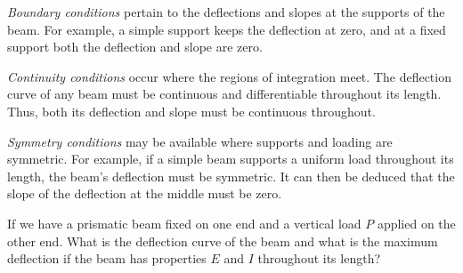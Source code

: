 \documentclass[
10pt,
a4paper,
openany,
svgnames,
]{kaobook} %
\begin{document}
\emph{Boundary conditions} pertain to the deflections and slopes at the supports of the beam. For example, a simple support keeps the deflection at zero, and at a fixed support both the deflection and slope are zero.

\emph{Continuity conditions} occur where the regions of integration meet. The deflection curve of any beam must be continuous and differentiable throughout its length. Thus, both its deflection and slope must be continuous throughout.

\emph{Symmetry conditions} may be available where supports and loading are symmetric. For example, if a simple beam supports a uniform load throughout its length, the beam's deflection must be symmetric. It can then be deduced that the slope of the deflection at the middle must be zero.

\begin{example} \label{example: cantilever beam deflection}
  If we have a prismatic beam fixed on one end and a vertical load $P$ applied on the other end. What is the deflection curve of the beam and what is the maximum deflection if the beam has properties $E$ and $I$ throughout its length?

  \begin{figure}[H]
    \centering
  \end{figure}
  
\end{example}
\end{document}
